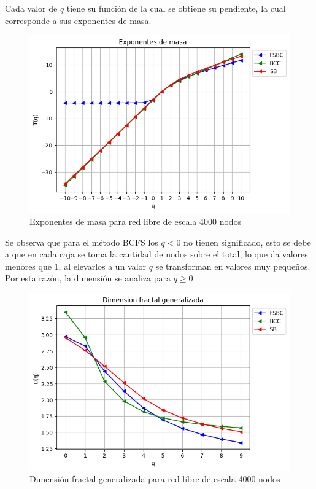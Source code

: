 Cada valor de $q$ tiene su función de la cual se obtiene su pendiente, la cual corresponde a sus exponentes de masa.

\begin{figure}[H]
    \centering
    \includegraphics[scale=0.7]{Capitulo4Multifractalidad/imagenes/scaleFree4000_TqscaleFree4000Nodes.png}
    \caption{Exponentes de masa para red libre de escala 4000 nodos}
\end{figure}

Se observa que para el método BCFS los $q<0$ no tienen significado, esto se debe a que en cada caja se toma la cantidad de nodos sobre el total, lo que da valores menores que 1, al elevarlos a un valor $q$ se transforman en valores muy pequeños. Por esta razón, la dimensión se analiza para $q\geq0$

\begin{figure}[H]
    \centering
    \includegraphics[scale=0.7]{Capitulo4Multifractalidad/imagenes/scaleFree4000_DqscaleFree4000Nodes.png}
    \caption{Dimensión fractal generalizada para red libre de escala 4000 nodos}
\end{figure}


